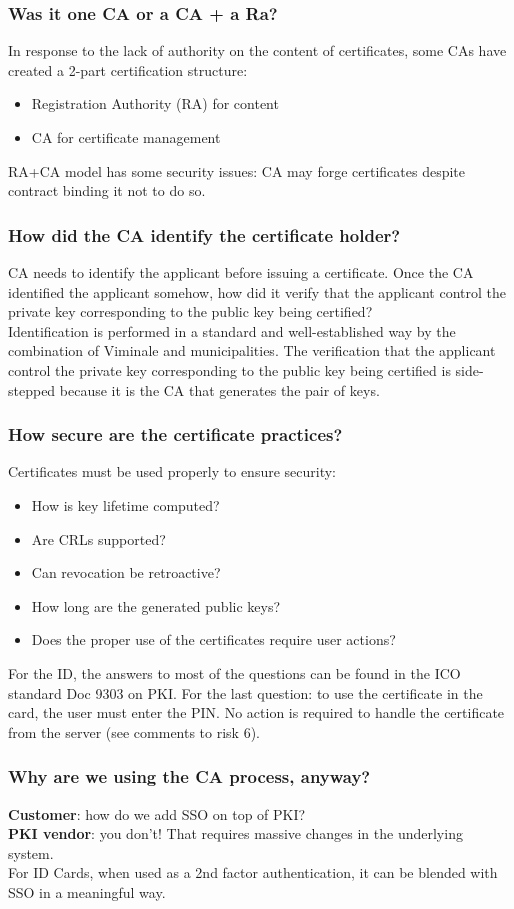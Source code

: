 \documentclass[a4paper, 10pt, titlepage]{article}
\begin{document}
\subsubsection*{Was it one CA or a CA + a Ra?}
In response to the lack of authority on the content of certificates, some CAs have created a 2-part certification structure:
\begin{itemize}
\item Registration Authority (RA) for content
\item CA for certificate management
\end{itemize}
RA+CA model has some security issues: CA may forge certificates despite contract binding it not to do so.
\subsubsection*{How did the CA identify the certificate holder?}
CA needs to identify the applicant before issuing a certificate. Once the CA identified the applicant somehow, how did it verify that the applicant control the private key corresponding to the public key
being certified? \medskip\\
Identification is performed in a standard and well-established way by the combination of Viminale and municipalities. The verification that the applicant control the private key corresponding to the public key being certified is side-stepped because it is the CA that generates the pair of keys.
\subsubsection*{How secure are the certificate practices?}
Certificates must be used properly to ensure security:
\begin{itemize}
\item How is key lifetime computed?
\item Are CRLs supported?
\item Can revocation be retroactive?
\item How long are the generated public keys?
\item Does the proper use of the certificates require user actions?
\end{itemize} \medskip
For the ID, the answers to most of the questions can be found in the ICO standard Doc 9303 on PKI. For the last question: to use the certificate in the card, the user must enter the PIN. No action is required to handle the certificate from the server (see comments to risk 6).
\subsubsection*{Why are we using the CA process, anyway?}
\textbf{Customer}: how do we add SSO on top of PKI?\\
\textbf{PKI vendor}: you don’t! That requires massive changes in the underlying system. \medskip\\
For ID Cards, when used as a 2nd factor authentication, it can be blended with SSO in a meaningful way.
\end{document}
